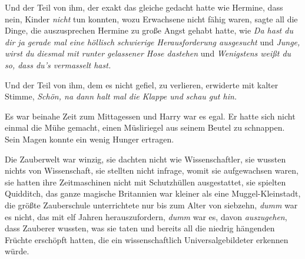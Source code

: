 Und der Teil von ihm, der exakt das gleiche gedacht hatte wie Hermine, dass nein, Kinder \emph{nicht} tun konnten, wozu Erwachsene nicht fähig waren, sagte all die Dinge, die auszusprechen Hermine zu große Angst gehabt hatte, wie \emph{Da hast du dir ja gerade mal eine höllisch schwierige Herausforderung ausgesucht} und \emph{Junge, wirst du diesmal mit runter gelassener Hose dastehen} und \emph{Wenigstens weißt du so, dass du’s vermasselt hast.}

Und der Teil von ihm, dem es nicht gefiel, zu verlieren, erwiderte mit kalter Stimme, \emph{Schön, na dann halt mal die Klappe und schau gut hin.}

\later

Es war beinahe Zeit zum Mittagessen und Harry war es egal. Er hatte sich nicht einmal die Mühe gemacht, einen Müsliriegel aus seinem Beutel zu schnappen. Sein Magen konnte ein wenig Hunger ertragen.

Die Zauberwelt war winzig, sie dachten nicht wie Wissenschaftler, sie wussten nichts von Wissenschaft, sie stellten nicht infrage, womit sie aufgewachsen waren, sie hatten ihre Zeitmaschinen nicht mit Schutzhüllen ausgestattet, sie spielten Quidditch, das ganze magische Britannien war kleiner als eine Muggel-Kleinstadt, die größte Zauberschule unterrichtete nur bis zum Alter von siebzehn, \emph{dumm} war es nicht, das mit elf Jahren herauszufordern, \emph{dumm} war es, davon \emph{auszugehen}, dass Zauberer wussten, was sie taten und bereits all die niedrig hängenden Früchte erschöpft hatten, die ein wissenschaftlich Universalgebildeter erkennen würde.

